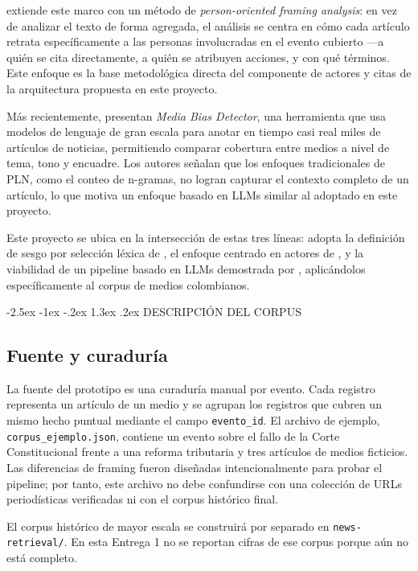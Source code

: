 \documentclass[10pt,twocolumn]{article}
\makeatletter
\renewcommand{\section}{\@startsection{section}{1}{\z@}%
  {-2.5ex \@plus -1ex \@minus -.2ex}%
  {1.3ex \@plus .2ex}%
  {\normalfont\large\bfseries\centering}}
\makeatother
\begin{document}
\cite{hamborg2023} extiende este marco con un método de
\emph{person-oriented framing analysis}: en vez de analizar el texto de
forma agregada, el análisis se centra en cómo cada artículo retrata
específicamente a las personas involucradas en el evento cubierto —a
quién se cita directamente, a quién se atribuyen acciones, y con qué
términos. Este enfoque es la base metodológica directa del componente de
actores y citas de la arquitectura propuesta en este proyecto.

Más recientemente, \cite{mediabiasdetector2025} presentan
\emph{Media Bias Detector}, una herramienta que usa modelos de lenguaje
de gran escala para anotar en tiempo casi real miles de artículos de
noticias, permitiendo comparar cobertura entre medios a nivel de tema,
tono y encuadre. Los autores señalan que los enfoques tradicionales de
PLN, como el conteo de n-gramas, no logran capturar el contexto completo
de un artículo, lo que motiva un enfoque basado en LLMs similar al
adoptado en este proyecto.

Este proyecto se ubica en la intersección de estas tres líneas: adopta la
definición de sesgo por selección léxica de \cite{hamborg2020}, el
enfoque centrado en actores de \cite{hamborg2023}, y la viabilidad de un
pipeline basado en LLMs demostrada por \cite{mediabiasdetector2025},
aplicándolos específicamente al corpus de medios colombianos.

\section{DESCRIPCIÓN DEL CORPUS}

\subsection{Fuente y curaduría}

La fuente del prototipo es una curaduría manual por evento. Cada registro
representa un artículo de un medio y se agrupan los registros que cubren un
mismo hecho puntual mediante el campo \texttt{evento\_id}. El archivo de ejemplo,
\texttt{corpus\_ejemplo.json}, contiene un evento sobre el fallo de la Corte
Constitucional frente a una reforma tributaria y tres artículos de medios
ficticios. Las diferencias de framing fueron diseñadas intencionalmente para
probar el pipeline; por tanto, este archivo no debe confundirse con una
colección de URLs periodísticas verificadas ni con el corpus histórico final.

El corpus histórico de mayor escala se construirá por separado en
\texttt{news-retrieval/}. En esta Entrega 1 no se reportan cifras de ese corpus porque
aún no está completo.
\end{document}
